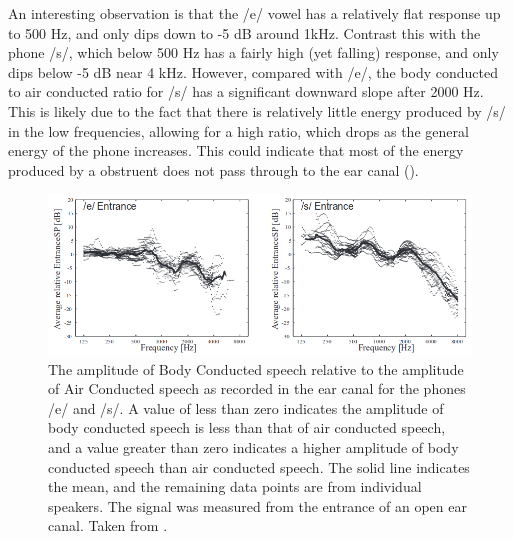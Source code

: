 \documentclass[dissertation,copyright]{uathesis}
\begin{document}
An interesting observation is that the /e/ vowel has a relatively flat response up to 500 Hz, and only dips down to -5 dB around 1kHz.  Contrast this with the phone /s/, which below 500 Hz has a fairly high (yet falling) response, and only dips below -5 dB near 4 kHz.  However, compared with /e/, the body conducted to air conducted ratio for /s/ has a significant downward slope after 2000 Hz.  This is likely due to the fact that there is relatively little energy produced by /s/ in the low frequencies, allowing for a high ratio, which drops as the general energy of the phone increases.  This could indicate that most of the energy produced by a obstruent does not pass through to the ear canal (\cite{reinfeldt:10}).
\begin{figure}
\includegraphics[width=1\textwidth]{figure/BCrelAC_e_s.png}
\caption{The amplitude of Body Conducted speech relative to the amplitude of Air Conducted  speech as recorded in the ear canal for the phones /e/ and /s/.  A value of less than zero indicates the amplitude of body conducted speech is less than that of air conducted speech, and a value greater than zero indicates a higher amplitude of body conducted speech than air conducted speech. The solid line indicates the mean, and the remaining data points are from individual speakers.  The signal was measured from the entrance of an open ear canal.  Taken from \cite{reinfeldt:10}.}
\label{BCrelAC}
\end{figure}
\end{document}

